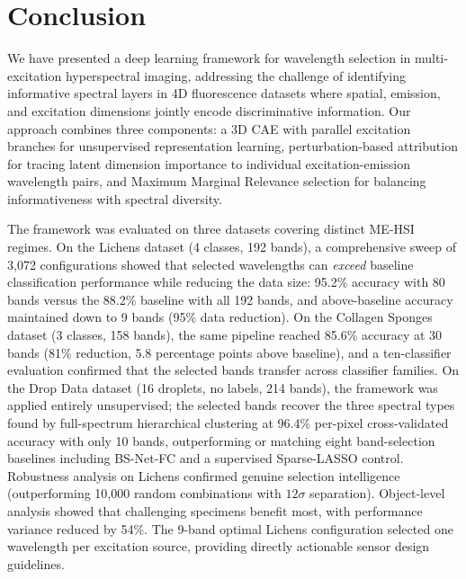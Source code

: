 \section{Conclusion}
\label{sec:conclusion}

We have presented a deep learning framework for wavelength selection in multi-excitation hyperspectral imaging, addressing the challenge of identifying informative spectral layers in 4D fluorescence datasets where spatial, emission, and excitation dimensions jointly encode discriminative information.
Our approach combines three components: a 3D CAE with parallel excitation branches for unsupervised representation learning, perturbation-based attribution for tracing latent dimension importance to individual excitation-emission wavelength pairs, and Maximum Marginal Relevance selection for balancing informativeness with spectral diversity.

The framework was evaluated on three datasets covering distinct ME-HSI regimes.
On the Lichens dataset (4 classes, 192 bands), a comprehensive sweep of 3,072 configurations showed that selected wavelengths can \emph{exceed} baseline classification performance while reducing the data size: 95.2\% accuracy with 80 bands versus the 88.2\% baseline with all 192 bands, and above-baseline accuracy maintained down to 9 bands (95\% data reduction).
On the Collagen Sponges dataset (3 classes, 158 bands), the same pipeline reached 85.6\% accuracy at 30 bands (81\% reduction, 5.8 percentage points above baseline), and a ten-classifier evaluation confirmed that the selected bands transfer across classifier families.
On the Drop Data dataset (16 droplets, no labels, 214 bands), the framework was applied entirely unsupervised; the selected bands recover the three spectral types found by full-spectrum hierarchical clustering at 96.4\% per-pixel cross-validated accuracy with only 10 bands, outperforming or matching eight band-selection baselines including BS-Net-FC and a supervised Sparse-LASSO control.
Robustness analysis on Lichens confirmed genuine selection intelligence (outperforming 10,000 random combinations with $12\sigma$ separation). Object-level analysis showed that challenging specimens benefit most, with performance variance reduced by 54\%.
The 9-band optimal Lichens configuration selected one wavelength per excitation source, providing directly actionable sensor design guidelines.


